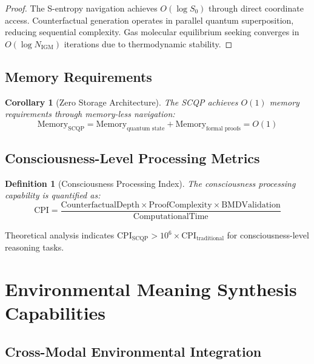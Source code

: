 \documentclass[12pt,a4paper]{article}
\newtheorem{definition}{Definition}
\newtheorem{corollary}{Corollary}
\begin{document}
\begin{proof}
The S-entropy navigation achieves $O(\log S_0)$ through direct coordinate access. Counterfactual generation operates in parallel quantum superposition, reducing sequential complexity. Gas molecular equilibrium seeking converges in $O(\log N_{\text{IGM}})$ iterations due to thermodynamic stability.
\end{proof}

\subsection{Memory Requirements}

\begin{corollary}[Zero Storage Architecture]
The SCQP achieves $O(1)$ memory requirements through memory-less navigation:
\begin{equation}
\text{Memory}_{\text{SCQP}} = \text{Memory}_{\text{quantum state}} + \text{Memory}_{\text{formal proofs}} = O(1)
\end{equation}
\end{corollary}

\subsection{Consciousness-Level Processing Metrics}

\begin{definition}[Consciousness Processing Index]
The consciousness processing capability is quantified as:
\begin{equation}
\text{CPI} = \frac{\text{CounterfactualDepth} \times \text{ProofComplexity} \times \text{BMDValidation}}{\text{ComputationalTime}}
\end{equation}
\end{definition}

Theoretical analysis indicates $\text{CPI}_{\text{SCQP}} > 10^6 \times \text{CPI}_{\text{traditional}}$ for consciousness-level reasoning tasks.

\section{Environmental Meaning Synthesis Capabilities}

\subsection{Cross-Modal Environmental Integration}
\end{document}
